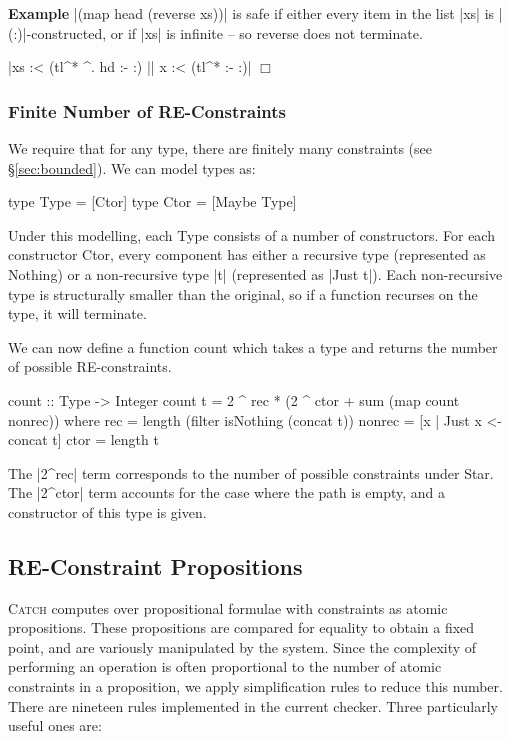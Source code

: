 \documentclass[preprint]{sigplanconf}
\newcommand{\C}[1]{\textsf{#1}}
\newcommand{\catch}{\textsc{Catch}}
\newcounter{exmp}
\newcommand{\yesexample}{\addtocounter{exmp}{1}\addvspace{2mm}\noindent\textbf{Example \arabic{exmp}}}
\newcommand{\noexample}{\hfill$\Box$\par\addvspace{2mm}}
\newenvironment{example}{\yesexample}{\noexample}
\begin{document}
\begin{example}
|(map head (reverse xs))| is safe if either every item in the list |xs| is |(:)|-constructed, or if |xs| is infinite -- so \C{reverse} does not terminate.

\smallskip\noindent |xs :< (tl^* ^. hd :- {:}) || x :< (tl^* :- {:})|
\end{example}

\subsubsection{Finite Number of RE-Constraints}
\label{sec:finite_re}

We require that for any type, there are finitely many constraints (see \S\ref{sec:bounded}). We can model types as:

\begin{code}
type Type  = [Ctor]
type Ctor  = [Maybe Type]
\end{code}

Under this modelling, each \C{Type} consists of a number of constructors. For each constructor \C{Ctor}, every component has either a recursive type (represented as \C{Nothing}) or a non-recursive type |t| (represented as |Just t|). Each non-recursive type is structurally smaller than the original, so if a function recurses on the type, it will terminate.

We can now define a function \C{count} which takes a type and returns the number of possible RE-constraints.

\begin{code}
count :: Type -> Integer
count t = 2 ^ rec * (2 ^ ctor + sum (map count nonrec))
    where
    rec = length (filter isNothing (concat t))
    nonrec = [x | Just x <- concat t]
    ctor = length t
\end{code}

The |2^rec| term corresponds to the number of possible constraints under \C{Star}. The |2^ctor| term accounts for the case where the path is empty, and a constructor of this type is given.


\subsection{RE-Constraint Propositions}
\label{sec:re-propositions}

\catch{} computes over propositional formulae with constraints as atomic propositions. These propositions are compared for equality to obtain a fixed point, and are variously manipulated by the system. Since the complexity of performing an operation is often proportional to the number of atomic constraints in a proposition, we apply simplification rules to reduce this number. There are nineteen rules implemented in the current checker. Three particularly useful ones are:
\end{document}
